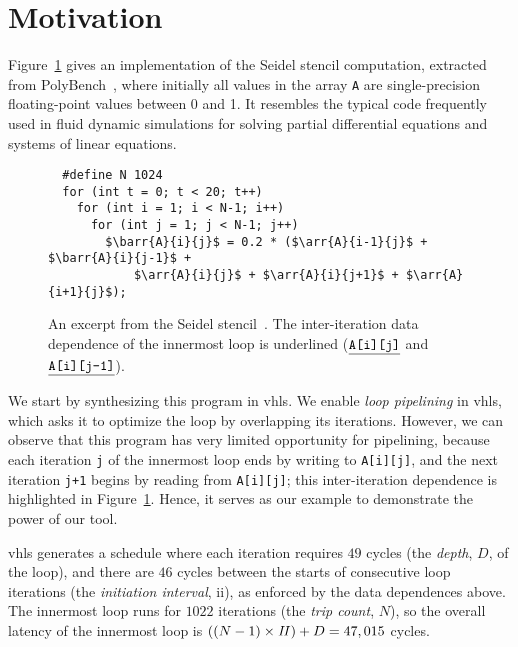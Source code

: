 \section{Motivation}
\label{lo:sec:motivation}


\newcommand\arr[3]{\texttt{#1[#2][#3]}}
\newcommand\barr[3]{\texttt{\underline{#1[#2][#3]}}}

Figure~\ref{lo:fig:seidel_prog} gives an implementation of the Seidel stencil
computation, extracted from PolyBench~\cite{polybench}, where initially all
values in the array \verb|A| are single-precision floating-point values between
0 and 1.  It resembles the typical code frequently used in fluid dynamic
simulations for solving partial differential equations and systems of linear
equations.

\begin{figure}[ht]
\begin{lstlisting}
  #define N 1024
  for (int t = 0; t < 20; t++)
    for (int i = 1; i < N-1; i++)
      for (int j = 1; j < N-1; j++)
        $\barr{A}{i}{j}$ = 0.2 * ($\arr{A}{i-1}{j}$ + $\barr{A}{i}{j-1}$ +
            $\arr{A}{i}{j}$ + $\arr{A}{i}{j+1}$ + $\arr{A}{i+1}{j}$);
\end{lstlisting}
    \caption{%
        An excerpt from the Seidel stencil~\cite{polybench}.  The
        inter-iteration data dependence of the innermost loop is underlined
        ($\barr{A}{i}{j}$ and $\barr{A}{i}{j-1}$).
    }\label{lo:fig:seidel_prog}
\end{figure}

We start by synthesizing this program in \gls{vhls}\@.  We enable \emph{loop
pipelining} in \gls{vhls}, which asks it to optimize the loop by overlapping
its iterations.  However, we can observe that this program has very limited
opportunity for pipelining, because each iteration \verb|j| of the innermost
loop ends by writing to \verb|A[i][j]|, and the next iteration \verb|j+1|
begins by reading from \verb|A[i][j]|; this inter-iteration dependence is
highlighted in Figure~\ref{lo:fig:seidel_prog}.  Hence, it serves as our
example to demonstrate the power of our tool.

\Gls{vhls} generates a schedule where each iteration requires $49$ cycles (the
\emph{depth}, $D$, of the loop), and there are $46$ cycles between the starts
of consecutive loop iterations (the \emph{initiation interval}, \gls{ii}),
as enforced by the data dependences above.  The innermost loop runs for
$1022$ iterations (the \emph{trip count}, $N$), so the overall latency of the
innermost loop is $((N-1) \times \mathit{II}) + D = 47,015$ cycles.

